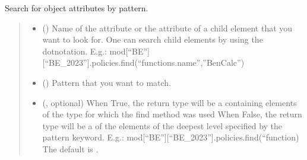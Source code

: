\documentclass[letterpaper,10pt,english]{sphinxmanual}
\begin{document}
\begin{fulllineitems}
\begin{fulllineitems}
\label{\detokenize{autoapi/euromod/container/index:euromod.container.Container.find}}
\pysigstartsignatures
{}
\pysigstopsignatures
\sphinxAtStartPar
Search for object attributes by pattern.
\begin{quote}\begin{description}
\begin{itemize}
\item {} 
\sphinxAtStartPar
{} () \textendash{} Name of the attribute or the attribute of a child element that you want to look for.
One can search child elements by using the dot\sphinxhyphen{}notation.
E.g.: mod{[}“BE”{]}{[}“BE\_2023”{]}.policies.find(“functions.name”,”BenCalc”)

\item {} 
\sphinxAtStartPar
{} () \textendash{} Pattern that you want to match.

\item {} 
\sphinxAtStartPar
{} (, optional) \textendash{} When True, the return type will be a {\hyperref[\detokenize{autoapi/euromod/container/index:euromod.container.Container}]{}} containing elements of the type for which the find method was used
When False, the return type will be a {\hyperref[\detokenize{autoapi/euromod/container/index:euromod.container.Container}]{}} of the elements of the deepest level specified by the pattern key\sphinxhyphen{}word.
E.g.: mod{[}“BE”{]}{[}“BE\_2023”{]}.policies.find(“function)
The default is .


\end{itemize}
\end{description}
\end{quote}
\end{fulllineitems}
\end{fulllineitems}
\end{document}
